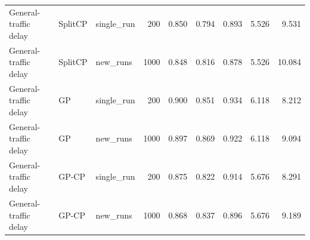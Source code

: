 \begin{table}[!htbp]
\begin{tabular}{lllrrrrrr}
General-traffic delay & SplitCP & single\_run & 200 & 0.850 & 0.794 & 0.893 & 5.526 & 9.531 \\
General-traffic delay & SplitCP & new\_runs & 1000 & 0.848 & 0.816 & 0.878 & 5.526 & 10.084 \\
General-traffic delay & GP & single\_run & 200 & 0.900 & 0.851 & 0.934 & 6.118 & 8.212 \\
General-traffic delay & GP & new\_runs & 1000 & 0.897 & 0.869 & 0.922 & 6.118 & 9.094 \\
General-traffic delay & GP-CP & single\_run & 200 & 0.875 & 0.822 & 0.914 & 5.676 & 8.291 \\
General-traffic delay & GP-CP & new\_runs & 1000 & 0.868 & 0.837 & 0.896 & 5.676 & 9.189 \\
\bottomrule
\end{tabular}
\end{table}
